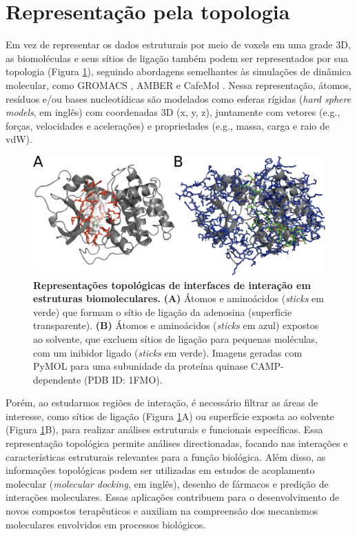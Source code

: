 \documentclass[Portugues]{phdquali}
\def\eg{e.g.\onedot}
\begin{document}
\section{Representação pela topologia}


Em vez de representar os dados estruturais por meio de voxels em uma grade 3D, as biomoléculas e seus sítios de ligação também podem ser representados por sua topologia (Figura \ref{fig:topology-representation}), seguindo abordagens semelhantes às simulações de dinâmica molecular, como GROMACS \cite{gromacs}, AMBER \cite{amber} e CafeMol \cite{kenzaki2011}. Nessa representação, átomos, resíduos e/ou bases nucleotídicas são modelados como esferas rígidas (\textit{hard sphere models}, em inglês) com coordenadas 3D (x, y, z), juntamente com vetores (\eg, forças, velocidades e acelerações) e propriedades (\eg, massa, carga e raio de vdW).

\begin{figure}[ht]
  \centerline{\includegraphics[scale=2]{images/topology-representation.png}}
  \caption[Representações topológicas de interfaces de interação em estruturas biomoleculares]{\textbf{Representações topológicas de interfaces de interação em estruturas biomoleculares.} \textbf{(A)} Átomos e aminoácidos (\textit{sticks} em verde) que formam o sítio de ligação da adenosina (superfície transparente). \textbf{(B)} Átomos e aminoácidos (\textit{sticks} em azul) expostos ao solvente, que excluem sítios de ligação para pequenas moléculas, com um inibidor ligado (\textit{sticks} em verde). Imagens geradas com PyMOL para uma subunidade da proteína quinase CAMP-dependente (PDB ID: 1FMO).}
  \label{fig:topology-representation}
\end{figure}

Porém, ao estudarmos regiões de interação, é necessário filtrar as áreas de interesse, como sítios de ligação (Figura \ref{fig:topology-representation}A) ou superfície exposta ao solvente (Figura \ref{fig:topology-representation}B), para realizar análises estruturais e funcionais específicas. Essa representação topológica permite análises directionadas, focando nas interações e características estruturais relevantes para a função biológica. Além disso, as informações topológicas podem ser utilizadas em estudos de acoplamento molecular (\textit{molecular docking}, em inglês), desenho de fármacos e predição de interações moleculares. Essas aplicações contribuem para o desenvolvimento de novos compostos terapêuticos e auxiliam na compreensão dos mecanismos moleculares envolvidos em processos biológicos.
\end{document}
